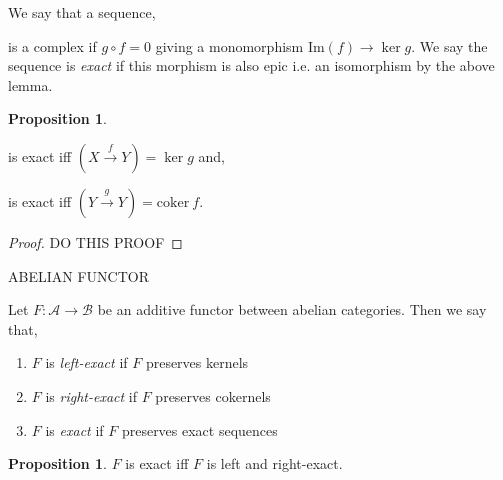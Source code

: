 \documentclass[12pt]{article}
\renewcommand{\Im}[1]{\mathrm{Im}(#1)}
\newcommand{\coker}[1]{\mathrm{coker} \: #1}
\newcommand{\A}{\mathcal{A}}
\newcommand{\B}{\mathcal{B}}
\theoremstyle{remark}
\theoremstyle{definition}
\newtheorem{proposition}[theorem]{Proposition}
\newenvironment{definition}[1][Definition:]{\begin{trivlist}
\item[\hskip \labelsep {\bfseries #1}]}{\end{trivlist}}
\begin{document}
\begin{definition}
We say that a sequence,
\begin{center}
\end{center}
is a complex if $g \circ f = 0$ giving a monomorphism $\Im{f} \to \ker{g}$. We say the sequence is \textit{exact} if this morphism is also epic i.e. an isomorphism by the above lemma. 
\end{definition}

\begin{proposition}
\begin{center}
\end{center}
is exact iff $(X \xrightarrow{f} Y) = \ker{g}$ and, 
\begin{center}
\end{center}
is exact iff $(Y \xrightarrow{g} Y) = \coker{f}$. 
\end{proposition}

\begin{proof}
DO THIS PROOF
\end{proof}

\begin{definition}
ABELIAN FUNCTOR
\end{definition}

\begin{definition}
Let $F : \A \to \B$ be an additive functor between abelian categories. Then we say that,
\begin{enumerate}
\item $F$ is \textit{left-exact} if $F$ preserves kernels
\item $F$ is \textit{right-exact} if $F$ preserves cokernels
\item $F$ is \textit{exact} if $F$ preserves exact sequences
\end{enumerate}
\end{definition}

\begin{proposition}
$F$ is exact iff $F$ is left and right-exact. 
\end{proposition}
\end{document}
